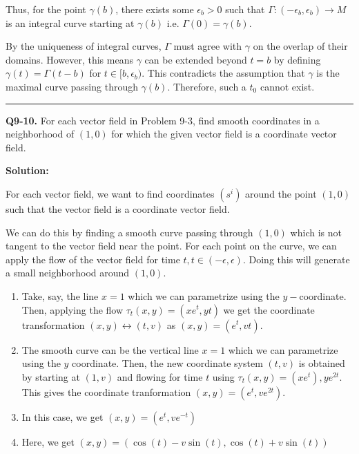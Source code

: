 \documentclass{article}
\begin{document}
\vskip 0.5cm
Thus, for the point $\gamma(b)$, there exists some $\epsilon_{b} > 0$ such that $\Gamma : (-\epsilon_b, \epsilon_b) \rightarrow M$ is an integral curve starting at $\gamma(b)$ i.e. $\Gamma(0) = \gamma(b)$. 

\vskip 0.5cm
By the uniqueness of integral curves, $\Gamma$ must agree with $\gamma$ on the overlap of their domains. However, this means $\gamma$ can be extended beyond $t = b$ by defining $\gamma(t) = \Gamma(t - b)$ for $t \in [b, \epsilon_b)$. This contradicts the assumption that $\gamma$ is the maximal curve passing through $\gamma(b)$. Therefore, such a $t_0$ cannot exist.  


\vskip 0.5cm
\hrule 
\vskip 0.5cm




\textbf{Q9-10.} For each vector field in Problem 9-3, find smooth coordinates in a neighborhood of $(1, 0)$ for which the given vector field is a coordinate vector field. 

\vskip 0.5cm
\textbf{Solution:}

For each vector field, we want to find coordinates $\left(s^i\right)$ around the point $(1,0)$ such that the vector field is a coordinate vector field.


We can do this by finding a smooth curve passing through $(1, 0)$ which is not tangent to the vector field near the point. For each point on the curve, we can apply the flow of the vector field for time $t, t \in (-\epsilon, \epsilon)$. Doing this will generate a small neighborhood around $(1,0)$.


\begin{enumerate}[label=(\alph*)]
  \item Take, say, the line $x = 1$ which we can parametrize using the $y-$coordinate. Then, applying the flow $\tau_t(x, y) = (xe^{t}, yt)$ we get the coordinate transformation $(x, y) \leftrightarrow (t, v)$ as $(x, y) = (e^t, vt)$.

  \item The smooth curve can be the vertical line $x = 1$ which we can parametrize using the $y$ coordinate. Then, the new coordinate system $(t, v)$ is obtained by starting at $(1,v)$ and flowing for time $t$ using $\tau_t(x, y) = (xe^t), ye^{2t}$. This gives the coordinate tranformation $(x, y) = (e^t, ve^{2t})$.
  
  \item In this case, we get $(x, y) = (e^t, ve^{-t})$
  \item Here, we get $(x, y) = (\cos(t) - v\sin(t), \cos(t) + v\sin(t))$
\end{enumerate}
\end{document}
